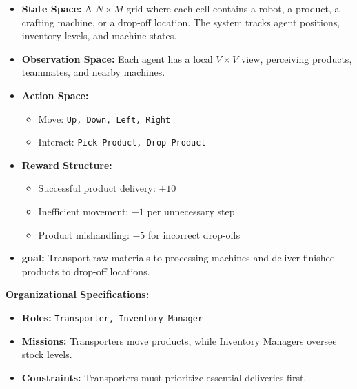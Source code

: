 \documentclass[pdflatex,sn-mathphys-num]{sn-jnl}%
\theoremstyle{thmstyleone}%
\theoremstyle{thmstyletwo}%
\theoremstyle{thmstylethree}%
\begin{document}
\begin{itemize}
    \item \textbf{State Space:} A $N \times M$ grid where each cell contains a robot, a product, a crafting machine, or a drop-off location. The system tracks agent positions, inventory levels, and machine states.
    \item \textbf{Observation Space:} Each agent has a local $V \times V$ view, perceiving products, teammates, and nearby machines.
    \item \textbf{Action Space:} 
    \begin{itemize}
        \item Move: \texttt{Up, Down, Left, Right}
        \item Interact: \texttt{Pick Product, Drop Product}
    \end{itemize}
    \item \textbf{Reward Structure:}
    \begin{itemize}
        \item Successful product delivery: $+10$
        \item Inefficient movement: $-1$ per unnecessary step
        \item Product mishandling: $-5$ for incorrect drop-offs
    \end{itemize}
    \item \textbf{goal:} Transport raw materials to processing machines and deliver finished products to drop-off locations.
\end{itemize}

\textbf{Organizational Specifications:} 
\begin{itemize}
    \item \textbf{Roles:} \texttt{Transporter, Inventory Manager}
    \item \textbf{Missions:} Transporters move products, while Inventory Managers oversee stock levels.
    \item \textbf{Constraints:} Transporters must prioritize essential deliveries first.
\end{itemize}
\end{document}
